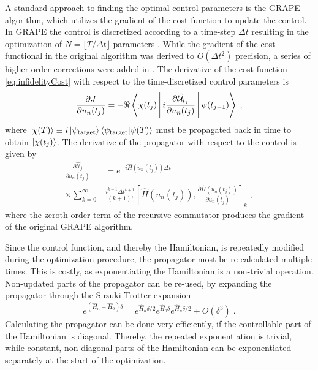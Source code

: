 \documentclass[%
 reprint,
 amsmath,amssymb,
 aps,
pra,
]{revtex4-1}
\begin{document}
A standard approach to finding the optimal control parameters is the GRAPE algorithm, which utilizes the gradient of the cost function to update the control. In GRAPE the control is discretized according to a time-step $\Delta t$ resulting in the optimization of $N = \lfloor T / \Delta t \rfloor$ parameters \cite{khaneja2005optimal}. While the gradient of the cost functional in the original algorithm was derived to $O(\Delta t ^2)$ precision, a series of higher order corrections were added in \cite{de2011second}. The derivative of the cost function \eqref{eq:infidelityCost} with respect to the time-discretized control parameters is
\begin{equation}
	\frac{\partial J}{\partial u_n (t_j)}  = - \Re \Braket{\chi (t_j) | i  \frac{\partial \hat{\mathcal{U}}_{t_j}}{\partial u_n (t_j)} | \psi (t_{j-1})} \; , \label{eq:CostDeriv}
\end{equation}
where $\ket{\chi (T)} \equiv i \ket{\psi_{\mathrm{target}}} \braket{\psi_{\mathrm{target}} | \psi (T)}$ must be propagated back in time to obtain $\ket{\chi (t_j)}$.
The derivative of the propagator with respect to the control is given by
\begin{align}
	\frac{\partial \hat{\mathcal{U}}_{j}}{\partial u_n (t_j)} &= e^{-i \hat{H} (u_n (t_j)) \Delta t} \nonumber \\ 
	 \times \sum_{k = 0}^{\infty } &  \frac{i^{k-1} \Delta t^{k+1}}{(k+1)!} \left[ \hat{H} (u_n (t_j)) , \frac{\partial \hat{H} (u_n (t_j))}{\partial u_n (t_j)}  \right]_k \; , \label{eq:PropDeriv}
\end{align}
where the zeroth order term of the recursive commutator produces the gradient of the original GRAPE algorithm.

Since the control function, and thereby the Hamiltonian, is repeatedly modified during the optimization procedure, the propagator most be re-calculated multiple times. This is costly, as exponentiating the Hamiltonian is a non-trivial operation. Non-updated parts of the propagator can be re-used, by expanding the propagator through the Suzuki-Trotter expansion 
\begin{equation}
		e ^{( \hat{H}_n + \hat{H}_0  ) \delta } = e^{  \hat{H}_n \delta /2  } e^{ \hat{H}_0 \delta } e^{ \hat{H}_n \delta /2 } + O(\delta^3) \; . \label{eq:SuzukiTrotter}
\end{equation}
Calculating the propagator can be done very efficiently, if the controllable part of the Hamiltonian is diagonal. Thereby, the repeated exponentiation is trivial, while constant, non-diagonal parts of the Hamiltonian can be exponentiated separately at the start of the optimization.
\end{document}
